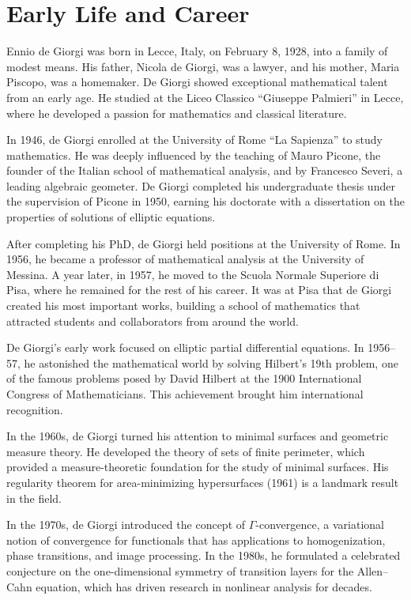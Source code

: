 \section{Early Life and Career}

Ennio de Giorgi was born in Lecce, Italy, on February 8, 1928, into a family of modest means. His father, Nicola de Giorgi, was a lawyer, and his mother, Maria Piscopo, was a homemaker. De Giorgi showed exceptional mathematical talent from an early age. He studied at the Liceo Classico ``Giuseppe Palmieri'' in Lecce, where he developed a passion for mathematics and classical literature.

In 1946, de Giorgi enrolled at the University of Rome ``La Sapienza'' to study mathematics. He was deeply influenced by the teaching of Mauro Picone, the founder of the Italian school of mathematical analysis, and by Francesco Severi, a leading algebraic geometer. De Giorgi completed his undergraduate thesis under the supervision of Picone in 1950, earning his doctorate with a dissertation on the properties of solutions of elliptic equations.

After completing his PhD, de Giorgi held positions at the University of Rome. In 1956, he became a professor of mathematical analysis at the University of Messina. A year later, in 1957, he moved to the Scuola Normale Superiore di Pisa, where he remained for the rest of his career. It was at Pisa that de Giorgi created his most important works, building a school of mathematics that attracted students and collaborators from around the world.

De Giorgi's early work focused on elliptic partial differential equations. In 1956--57, he astonished the mathematical world by solving Hilbert's 19th problem, one of the famous problems posed by David Hilbert at the 1900 International Congress of Mathematicians. This achievement brought him international recognition.

In the 1960s, de Giorgi turned his attention to minimal surfaces and geometric measure theory. He developed the theory of sets of finite perimeter, which provided a measure-theoretic foundation for the study of minimal surfaces. His regularity theorem for area-minimizing hypersurfaces (1961) is a landmark result in the field.

In the 1970s, de Giorgi introduced the concept of \(\Gamma\)-convergence, a variational notion of convergence for functionals that has applications to homogenization, phase transitions, and image processing. In the 1980s, he formulated a celebrated conjecture on the one-dimensional symmetry of transition layers for the Allen--Cahn equation, which has driven research in nonlinear analysis for decades.

